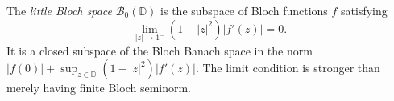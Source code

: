
The \emph{little Bloch space} $\mathcal B_0(\mathbb D)$ is the subspace of Bloch functions $f$ satisfying
\[
\lim_{|z|\to1^-}(1-|z|^2)|f'(z)|=0.
\]
It is a closed subspace of the Bloch Banach space in the norm $|f(0)|+\sup_{z\in\mathbb D}(1-|z|^2)|f'(z)|$. The limit condition is stronger than merely having finite Bloch seminorm.
